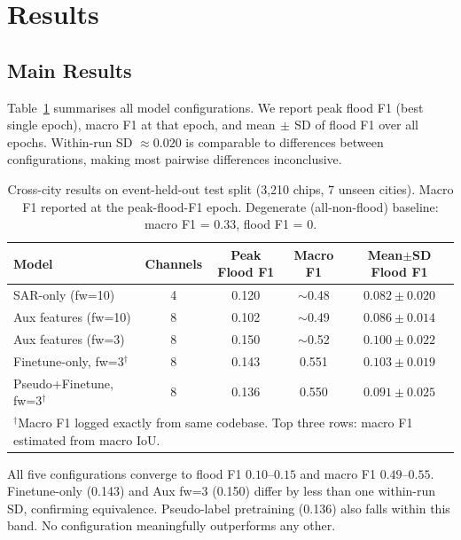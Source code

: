 \documentclass[10pt,twocolumn]{article}
\begin{document}
\section{Results}

\subsection{Main Results}
\label{sec:results}

Table~\ref{tab:main} summarises all model configurations.
We report peak flood F1 (best single epoch), macro F1 at that epoch,
and mean$\,\pm\,$SD of flood F1 over all epochs.
Within-run SD $\approx 0.020$ is comparable to differences between
configurations, making most pairwise differences inconclusive.

\begin{table}[t]
\centering\small
\caption{Cross-city results on event-held-out test split (3,210 chips, 7 unseen cities).
  Macro F1 reported at the peak-flood-F1 epoch.
  Degenerate (all-non-flood) baseline: macro F1 = 0.33, flood F1 = 0.}
\label{tab:main}
\begin{tabular}{lcccc}
\toprule
Model & Channels & Peak Flood F1 & Macro F1 & Mean$\pm$SD Flood F1 \\
\midrule
SAR-only (fw=10)               & 4 & 0.120 & $\sim$0.48 & $0.082\pm0.020$ \\
Aux features (fw=10)           & 8 & 0.102 & $\sim$0.49 & $0.086\pm0.014$ \\
Aux features (fw=3)            & 8 & 0.150 & $\sim$0.52 & $0.100\pm0.022$ \\
\midrule
Finetune-only, fw=3$^\dagger$  & 8 & 0.143 & 0.551      & $0.103\pm0.019$ \\
Pseudo+Finetune, fw=3$^\dagger$& 8 & 0.136 & 0.550      & $0.091\pm0.025$ \\
\bottomrule
\multicolumn{5}{l}{$^\dagger$Macro F1 logged exactly from same codebase.
  Top three rows: macro F1 estimated from macro IoU.}
\end{tabular}
\end{table}

All five configurations converge to flood F1 $0.10$--$0.15$ and
macro F1 $0.49$--$0.55$.
Finetune-only (0.143) and Aux fw=3 (0.150) differ by less than one
within-run SD, confirming equivalence.  Pseudo-label pretraining
(0.136) also falls within this band.  No configuration meaningfully
outperforms any other.
\end{document}
